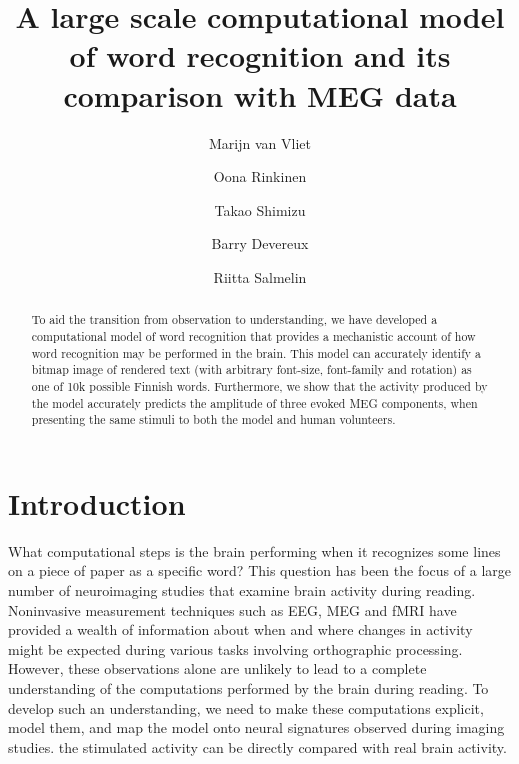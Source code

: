 \documentclass[a4paper, 10pt]{vanvliet_paper}
\title{A large scale computational model of word recognition and its comparison with MEG data}
\author[1*]{Marijn van Vliet}
\author[1]{Oona Rinkinen}
\author[1]{Takao Shimizu}
\author[2]{Barry Devereux}
\author[1]{Riitta Salmelin}
\affil[1]{Department of Neuroscience and Biomedical Engineering, Aalto University}
\affil[2]{School of Electronics, Electrical Engineering and Computer Science, Queen's University Belfast}
\affil[*]{Corresponding author: marijn.vanvliet@aalto.fi}
\begin{document}
\maketitle

\begin{abstract}
To aid the transition from observation to understanding, we have developed a computational model of word recognition that provides a mechanistic account of how word recognition may be performed in the brain.
This model can accurately identify a bitmap image of rendered text (with arbitrary font-size, font-family and rotation) as one of 10k possible Finnish words.
Furthermore, we show that the activity produced by the model accurately predicts the amplitude of three evoked \gls{MEG} components, when presenting the same stimuli to both the model and human volunteers.
\end{abstract}

\section{Introduction}

What computational steps is the brain performing when it recognizes some lines on a piece of paper as a specific word?
This question has been the focus of a large number of neuroimaging studies that examine brain activity during reading.
Noninvasive measurement techniques such as \gls{EEG}\cite{Grainger2009}, \gls{MEG}\cite{Salmelin2007} and \gls{fMRI}\cite{Price2012} have provided a wealth of information about when and where changes in activity might be expected during various tasks involving orthographic processing\cite{Carreiras2014}.
However, these observations alone are unlikely to lead to a complete understanding of the computations performed by the brain during reading\cite{Poeppel2012}.
To develop such an understanding, we need to make these computations explicit, model them, and map the model onto neural signatures observed during imaging studies\cite{Barber2007, Price2018}.
the stimulated activity can be directly compared with real brain activity.
\end{document}

